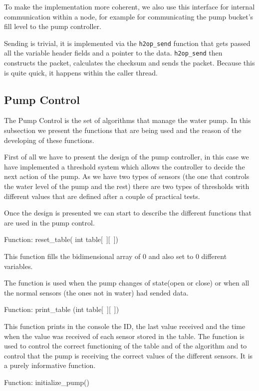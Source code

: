 \documentclass[11pt,paper=a4,parskip=half]{scrartcl}
\begin{document}
To make the implementation more coherent, we also use this interface for internal communication within a node, for example for communicating the pump bucket's fill level to the pump controller.


Sending is trivial, it is implemented via the \texttt{h2op\_\allowbreak send} function that gets passed all the variable header fields and a pointer to the data. \texttt{h2op\_\allowbreak send} then constructs the packet, calculates the checksum and sends the packet. Because this is quite quick, it happens within the caller thread.



\subsection{Pump Control}

The Pump Control is the set of algorithms that manage the water pump.
In this subsection we present the functions that are being used and the reason of the developing of these functions.

First of all we have to present the design of the pump controller, in this case we have implemented a threshold system which allows the controller to decide the next action of the pump. As we have two types of sensors (the one that controls the water level of the pump and the rest) there are two types of thresholds with different values that are defined after a couple of practical tests.

Once the design is presented we can start to describe the different functions that are used in the pump control.

Function: reset\_table( int table[~][~])

This function  fills the bidimensional array of 0 and also set to 0 different variables.

The function is used when the pump changes of state(open or close) or when all the normal sensors (the ones not in water) had sended data.

Function: print\_table (int table[~][~])

This function prints in the console the ID, the last value received and the time when the value was received of each sensor stored in the table.
The function is used to control the correct functioning of the table and of the algorithm and to control that the pump is receiving the correct values of the different sensors.
It is a purely informative function.

Function: initialize\_pump()
\end{document}
